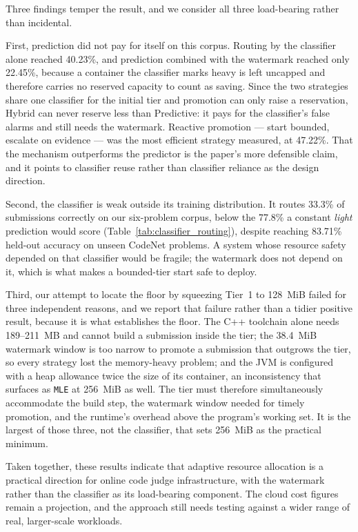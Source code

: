 \documentclass[conference]{IEEEtran}
\begin{document}
Three findings temper the result, and we consider all three load-bearing rather than incidental.

First, prediction did not pay for itself on this corpus. Routing by the classifier alone reached 40.23\%, and prediction combined with the watermark reached only 22.45\%, because a container the classifier marks heavy is left uncapped and therefore carries no reserved capacity to count as saving. Since the two strategies share one classifier for the initial tier and promotion can only raise a reservation, Hybrid can never reserve less than Predictive: it pays for the classifier's false alarms and still needs the watermark. Reactive promotion --- start bounded, escalate on evidence --- was the most efficient strategy measured, at 47.22\%. That the mechanism outperforms the predictor is the paper's more defensible claim, and it points to classifier reuse rather than classifier reliance as the design direction.

Second, the classifier is weak outside its training distribution. It routes 33.3\% of submissions correctly on our six-problem corpus, below the 77.8\% a constant \emph{light} prediction would score (Table~\ref{tab:classifier_routing}), despite reaching 83.71\% held-out accuracy on unseen CodeNet problems. A system whose resource safety depended on that classifier would be fragile; the watermark does not depend on it, which is what makes a bounded-tier start safe to deploy.

Third, our attempt to locate the floor by squeezing Tier~1 to 128~MiB failed for three independent reasons, and we report that failure rather than a tidier positive result, because it is what establishes the floor. The C++ toolchain alone needs 189--211~MB and cannot build a submission inside the tier; the 38.4~MiB watermark window is too narrow to promote a submission that outgrows the tier, so every strategy lost the memory-heavy problem; and the JVM is configured with a heap allowance twice the size of its container, an inconsistency that surfaces as \texttt{MLE} at 256~MiB as well. The tier must therefore simultaneously accommodate the build step, the watermark window needed for timely promotion, and the runtime's overhead above the program's working set. It is the largest of those three, not the classifier, that sets 256~MiB as the practical minimum.

Taken together, these results indicate that adaptive resource allocation is a practical direction for online code judge infrastructure, with the watermark rather than the classifier as its load-bearing component. The cloud cost figures remain a projection, and the approach still needs testing against a wider range of real, larger-scale workloads.
\end{document}
